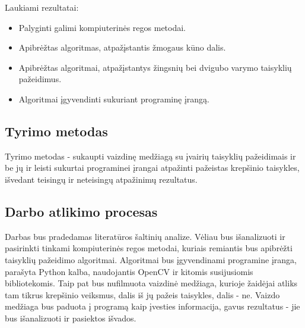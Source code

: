 \documentclass{VUMIFPSbakalaurinis}
\begin{document}
Laukiami rezultatai:
\begin{itemize}[topsep=5pt,itemsep=-1ex,partopsep=2ex,parsep=2ex]
 \item Palyginti galimi kompiuterinės regos metodai.
 \item Apibrėžtas algoritmas, atpažįstantis žmogaus kūno dalis.
 \item Apibrėžtas algoritmai, atpažįstantys žingsnių bei dvigubo varymo taisyklių pažeidimus.
 \item Algoritmai įgyvendinti sukuriant programinę įrangą.
\end{itemize}

\subsection{Tyrimo metodas}
Tyrimo metodas - sukaupti vaizdinę medžiagą su įvairių taisyklių pažeidimais ir be jų ir leisti sukurtai programinei įrangai atpažinti pažeistas krepšinio taisykles, išvedant teisingų ir neteisingų atpažinimų rezultatus.

\subsection{Darbo atlikimo procesas}
Darbas bus pradedamas literatūros šaltinių analize. Vėliau bus išanalizuoti ir pasirinkti tinkami kompiuterinės regos metodai, kuriais remiantis bus apibrėžti taisyklių pažeidimo algoritmai. Algoritmai bus įgyvendinami programine įranga, parašyta Python kalba, naudojantis OpenCV ir kitomis susijusiomis bibliotekomis. Taip pat bus nufilmuota vaizdinė medžiaga, kurioje žaidėjai atliks tam tikrus krepšinio veiksmus, dalis iš jų pažeis taisykles, dalis - ne. Vaizdo medžiaga bus paduota į programą kaip įvesties informacija, gavus rezultatus - jie bus išanalizuoti ir pasiektos išvados. 
\end{document}
